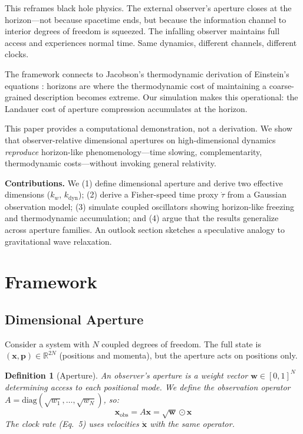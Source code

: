 \documentclass[11pt,a4paper]{article}
\newtheorem{definition}{Definition}
\begin{document}
This reframes black hole physics. The external observer's aperture closes at the horizon---not because spacetime ends, but because the information channel to interior degrees of freedom is squeezed. The infalling observer maintains full access and experiences normal time. Same dynamics, different channels, different clocks.

The framework connects to Jacobson's thermodynamic derivation of Einstein's equations \cite{jacobson1995}: horizons are where the thermodynamic cost of maintaining a coarse-grained description becomes extreme. Our simulation makes this operational: the Landauer cost of aperture compression accumulates at the horizon.

This paper provides a computational demonstration, not a derivation. We show that observer-relative dimensional apertures on high-dimensional dynamics \emph{reproduce} horizon-like phenomenology---time slowing, complementarity, thermodynamic costs---without invoking general relativity.

\textbf{Contributions.} We (1) define dimensional aperture and derive two effective dimensions ($k_w$, $k_{\mathrm{dyn}}$); (2) derive a Fisher-speed time proxy $\dot{\tau}$ from a Gaussian observation model; (3) simulate coupled oscillators showing horizon-like freezing and thermodynamic accumulation; and (4) argue that the results generalize across aperture families. An outlook section sketches a speculative analogy to gravitational wave relaxation.

\section{Framework}

\subsection{Dimensional Aperture}

Consider a system with $N$ coupled degrees of freedom. The full state is $(\mathbf{x}, \mathbf{p}) \in \mathbb{R}^{2N}$ (positions and momenta), but the aperture acts on positions only.

\begin{definition}[Aperture]
An observer's aperture is a weight vector $\mathbf{w} \in [0,1]^N$ determining access to each positional mode. We define the observation operator $A = \mathrm{diag}(\sqrt{w_1}, \ldots, \sqrt{w_N})$, so:
\begin{equation}
    \mathbf{x}_{\mathrm{obs}} = A\mathbf{x} = \sqrt{\mathbf{w}} \odot \mathbf{x}
\end{equation}
The clock rate (Eq.~5) uses velocities $\dot{\mathbf{x}}$ with the same operator.
\end{definition}
\end{document}
